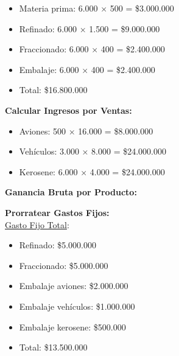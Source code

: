 \documentclass[10pt,a4paper]{article}
\begin{document}
\begin{enumerate}
\begin{itemize}
        \item Materia prima: 6.000 × 500 = \$3.000.000
        \item Refinado: 6.000 × 1.500 = \$9.000.000
        \item Fraccionado: 6.000 × 400 = \$2.400.000
        \item Embalaje: 6.000 × 400 = \$2.400.000 \\
        \item Total: \$16.800.000\\

    \end{itemize}

    \textbf{Calcular Ingresos por Ventas:}

    \begin{itemize}

        \item Aviones: 500 × 16.000 = \$8.000.000
        \item Vehículos: 3.000 × 8.000 = \$24.000.000
        \item Kerosene: 6.000 × 4.000 = \$24.000.000 \\

    \end{itemize}

    \textbf{Ganancia Bruta por Producto:}

    \begin{center}
    \end{center}
    
    \clearpage

    \textbf{Prorratear Gastos Fijos:} \\

    \underline{Gasto Fijo Total}:

    \begin{itemize}

        \item Refinado: \$5.000.000
        \item Fraccionado: \$5.000.000
        \item Embalaje aviones: \$2.000.000
        \item Embalaje vehículos: \$1.000.000
        \item Embalaje kerosene: \$500.000 \\
        \item Total: \$13.500.000 \\


\end{itemize}
\end{enumerate}
\end{document}

